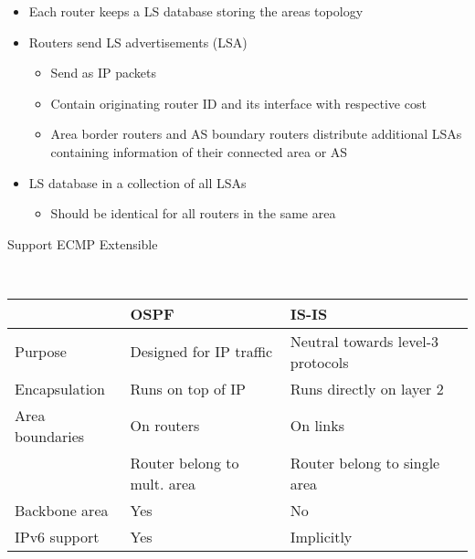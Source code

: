 \begin{itemize}
\begin{itemize}
\begin{itemize}
\begin{itemize}
\begin{itemize}
                                \item Each router keeps a LS database storing the areas topology
                                \item Routers send LS advertisements (LSA)
                                    \begin{itemize}
                                        \item Send as IP packets
                                        \item Contain originating router ID and its interface with respective cost
                                        \item Area border routers and AS boundary routers distribute additional LSAs containing information of their connected area or AS
                                    \end{itemize}
                                \item LS database in a collection of all LSAs
                                    \begin{itemize}
                                        \item Should be identical for all routers in the same area
                                    \end{itemize}
                            \end{itemize}
                        \ipro Support ECMP
                        \ipro Extensible
                    \end{itemize}
                \\
\begin{tabular}{| l | l | l |}
    & OSPF & IS-IS\\\hline
    Purpose & Designed for IP traffic & Neutral towards level-3 protocols\\
    Encapsulation & Runs on top of IP & Runs directly on layer 2\\
    Area boundaries & On routers & On links \\
                    & Router belong to mult. area & Router belong to single area\\
    Backbone area & Yes & No\\
    IPv6 support & Yes & Implicitly
\end{tabular}
            \end{itemize}
    \end{itemize}
    \\
\begin{tabular}{| l | l | l |}

\end{tabular}
\end{itemize}
